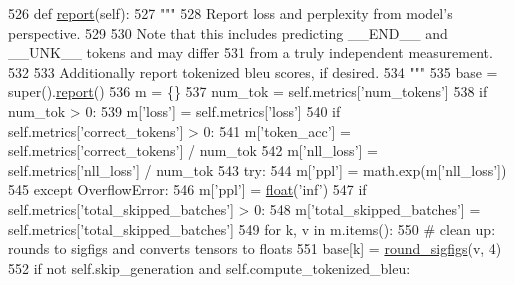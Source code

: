 \begin{DoxyCode}
526     \textcolor{keyword}{def }\hyperlink{namespaceprojects_1_1convai2_1_1eval__f1_a01a47b9c08dad189837a51f085defc45}{report}(self):
527         \textcolor{stringliteral}{"""}
528 \textcolor{stringliteral}{        Report loss and perplexity from model's perspective.}
529 \textcolor{stringliteral}{}
530 \textcolor{stringliteral}{        Note that this includes predicting \_\_END\_\_ and \_\_UNK\_\_ tokens and may differ}
531 \textcolor{stringliteral}{        from a truly independent measurement.}
532 \textcolor{stringliteral}{}
533 \textcolor{stringliteral}{        Additionally report tokenized bleu scores, if desired.}
534 \textcolor{stringliteral}{        """}
535         base = super().\hyperlink{namespaceprojects_1_1convai2_1_1eval__f1_a01a47b9c08dad189837a51f085defc45}{report}()
536         m = \{\}
537         num\_tok = self.metrics[\textcolor{stringliteral}{'num\_tokens'}]
538         \textcolor{keywordflow}{if} num\_tok > 0:
539             m[\textcolor{stringliteral}{'loss'}] = self.metrics[\textcolor{stringliteral}{'loss'}]
540             \textcolor{keywordflow}{if} self.metrics[\textcolor{stringliteral}{'correct\_tokens'}] > 0:
541                 m[\textcolor{stringliteral}{'token\_acc'}] = self.metrics[\textcolor{stringliteral}{'correct\_tokens'}] / num\_tok
542             m[\textcolor{stringliteral}{'nll\_loss'}] = self.metrics[\textcolor{stringliteral}{'nll\_loss'}] / num\_tok
543             \textcolor{keywordflow}{try}:
544                 m[\textcolor{stringliteral}{'ppl'}] = math.exp(m[\textcolor{stringliteral}{'nll\_loss'}])
545             \textcolor{keywordflow}{except} OverflowError:
546                 m[\textcolor{stringliteral}{'ppl'}] = \hyperlink{namespaceprojects_1_1controllable__dialogue_1_1make__control__dataset_aa2b7207688c641dbc094ab44eca27113}{float}(\textcolor{stringliteral}{'inf'})
547         \textcolor{keywordflow}{if} self.metrics[\textcolor{stringliteral}{'total\_skipped\_batches'}] > 0:
548             m[\textcolor{stringliteral}{'total\_skipped\_batches'}] = self.metrics[\textcolor{stringliteral}{'total\_skipped\_batches'}]
549         \textcolor{keywordflow}{for} k, v \textcolor{keywordflow}{in} m.items():
550             \textcolor{comment}{# clean up: rounds to sigfigs and converts tensors to floats}
551             base[k] = \hyperlink{namespaceparlai_1_1agents_1_1legacy__agents_1_1seq2seq_1_1utils__v0_af377ec61bfc0423461e7b409ffc883b9}{round\_sigfigs}(v, 4)
552         \textcolor{keywordflow}{if} \textcolor{keywordflow}{not} self.skip\_generation \textcolor{keywordflow}{and} self.compute\_tokenized\_bleu:

\end{DoxyCode}
